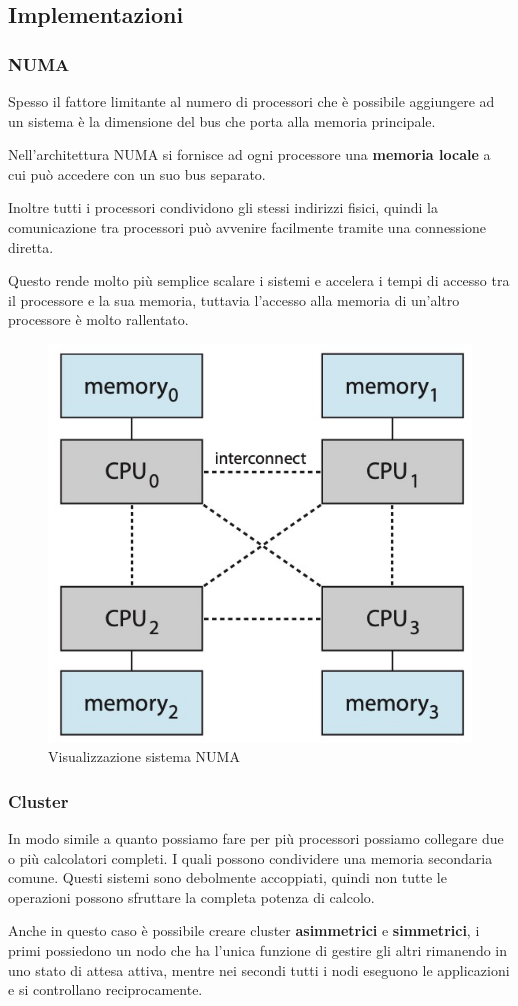 \subsection{Implementazioni}

\subsubsection{NUMA}
Spesso il fattore limitante al numero di processori che è possibile aggiungere ad un sistema è la dimensione del bus che porta alla memoria principale.

\spacer
Nell'architettura NUMA si fornisce ad ogni processore una \textbf{memoria locale} a cui può accedere con un suo bus separato.

Inoltre tutti i processori condividono gli stessi indirizzi fisici, quindi la comunicazione tra processori può avvenire facilmente tramite una connessione diretta.

\spacer

Questo rende molto più semplice scalare i sistemi e accelera i tempi di accesso tra il processore e la sua memoria, tuttavia l'accesso alla memoria di un'altro processore è molto rallentato.

\begin{figure}[H]
    \centering
    \includegraphics[width=0.3\linewidth]{assets/NUMA.jpg}
    \caption{Visualizzazione sistema NUMA}
\end{figure}

\subsubsection{Cluster}
In modo simile a quanto possiamo fare per più processori possiamo collegare due o più calcolatori completi. I quali possono condividere una memoria secondaria comune.
Questi sistemi sono debolmente accoppiati, quindi non tutte le operazioni possono sfruttare la completa potenza di calcolo.

Anche in questo caso è possibile creare cluster \textbf{asimmetrici} e \textbf{simmetrici}, i primi possiedono un nodo che ha l'unica funzione di gestire gli altri rimanendo in uno stato di attesa attiva, mentre nei secondi tutti i nodi eseguono le applicazioni e si controllano reciprocamente.

